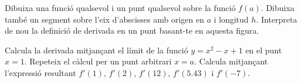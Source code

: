 \begin{mylist}

\exer  Dibuixa una funció qualsevol i un punt qualsevol sobre la funció $f(a)$. Dibuixa també un segment sobre l'eix d'abscisses amb origen en  $a$ i longitud $h$. 
Interpreta de nou la definició de derivada en un punt basant-te en aquesta figura.


\exer  Calcula la derivada mitjançant el límit de la funció $y= x^2 - x+ 1$ en el punt $x=1$. Repeteix el càlcul per un punt arbitrari $x=a$. 
Calcula mitjançant l'expressió resultant $f'(1)$, $f'(2)$, $f'(12)$, $f'(5.43)$ i $f'(-7)$.

\end{mylist}

 
 



